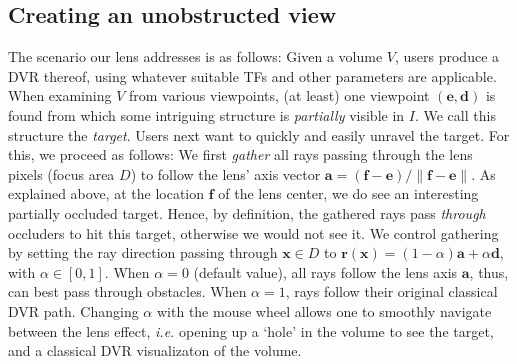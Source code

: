 \subsection{Creating an unobstructed view}
\label{sec:gathering}
%
The scenario our lens addresses is as follows: Given a volume $V$, users produce a DVR thereof, using whatever suitable TFs and other parameters are applicable. When examining $V$ from various viewpoints, (at least) one viewpoint $(\mathbf{e},\mathbf{d})$ is found from which some intriguing structure is \emph{partially} visible in $I$. We call this structure the \emph{target}. Users next want to quickly and easily unravel the target. For this, we proceed as follows: We first \emph{gather} all rays passing through the lens pixels (focus area $D$) to follow the lens' axis vector $\mathbf{a} = (\mathbf{f} - \mathbf{e}) / \| \mathbf{f} - \mathbf{e} \|$. As explained above, at the location $\mathbf{f}$ of the lens center, we do see an interesting partially occluded target. Hence, by definition, the gathered rays pass \emph{through} occluders to hit this target, otherwise we would not see it. We control gathering by setting the ray direction passing through $\mathbf{x} \in D$ to $\mathbf{r}(\mathbf{x}) = (1-\alpha) \mathbf{a} + \alpha \mathbf{d}$, with $\alpha \in [0,1]$. When $\alpha=0$ (default value), all rays follow the lens axis $\mathbf{a}$, thus, can best pass through obstacles. When $\alpha=1$, rays follow their original classical DVR path. Changing $\alpha$ with the mouse wheel allows one to smoothly navigate between the lens effect, \emph{i.e.} opening up a `hole' in the volume to see the target, and a classical DVR visualizaton of the volume.
%
